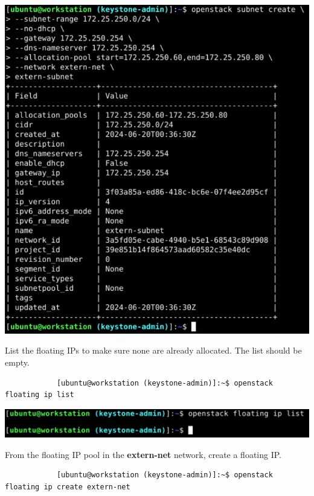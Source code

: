 \documentclass[letterpaper, 12pt]{article}
\begin{document}
\begin{enumerate}
\begin{labstep}
        \begin{center}
            \includegraphics[width=\linewidth]{images/part1/step13.png}
        \end{center}
    \end{labstep}

    \begin{labstep}
        List the floating IPs to make sure none are already allocated.
        The list should be empty.
        \begin{lstlisting}
            [ubuntu@workstation (keystone-admin)]:~$ openstack floating ip list
        \end{lstlisting}

        \begin{center}
            \includegraphics[width=\linewidth]{images/part1/step14.png}
        \end{center}
    \end{labstep}

    \begin{labstep}
        From the floating IP pool in the \textbf{extern-net} network, create a floating IP.
        \begin{lstlisting}
            [ubuntu@workstation (keystone-admin)]:~$ openstack floating ip create extern-net
        \end{lstlisting}


\end{labstep}
\end{enumerate}
\end{document}
